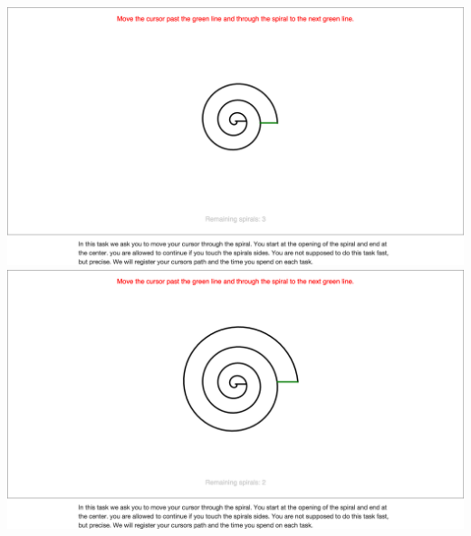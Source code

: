 \begin{appendices}
\begin{minipage}{\textwidth}
\centering
\includegraphics[width=\textwidth]{images/screenshots/ex_step_5_spiral_2}
\label{fig:ex_step_5_spiral_2}
\includegraphics[width=\textwidth]{images/screenshots/ex_step_5_spiral_3}
\label{fig:ex_step_5_spiral_3}
\end{minipage}


\end{appendices}
